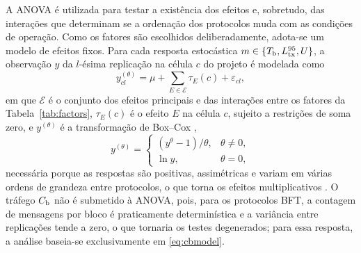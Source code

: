 A ANOVA é utilizada para testar a existência dos efeitos e, sobretudo, das interações que determinam se a ordenação dos protocolos muda com as condições de operação. Como os fatores são escolhidos deliberadamente, adota-se um modelo de efeitos fixos. Para cada resposta estocástica $m \in \{T_{\mathrm{b}}, L^{95}_{\mathrm{tx}}, U\}$, a observação $y$ da $l$-ésima replicação na célula $c$ do projeto é modelada como
\begin{equation}
y^{(\theta)}_{cl} = \mu + \sum_{E \in \mathcal{E}} \tau_{E}(c) + \varepsilon_{cl},
\label{eq:anova}
\end{equation}
em que $\mathcal{E}$ é o conjunto dos efeitos principais e das interações entre os fatores da Tabela~\ref{tab:factors}, $\tau_{E}(c)$ é o efeito $E$ na célula $c$, sujeito a restrições de soma zero, e $y^{(\theta)}$ é a transformação de Box--Cox \citep{BoxCox1964},
\begin{equation}
y^{(\theta)} = \begin{cases} (y^{\theta}-1)/\theta, & \theta \neq 0, \\ \ln y, & \theta = 0, \end{cases}
\label{eq:boxcox}
\end{equation}
necessária porque as respostas são positivas, assimétricas e variam em várias ordens de grandeza entre protocolos, o que torna os efeitos multiplicativos \citep{Jain1991,Montgomery2017}. O tráfego $C_{\mathrm{b}}$ não é submetido à ANOVA, pois, para os protocolos BFT, a contagem de mensagens por bloco é praticamente determinística e a variância entre replicações tende a zero, o que tornaria os testes degenerados; para essa resposta, a análise baseia-se exclusivamente em \eqref{eq:cbmodel}.

